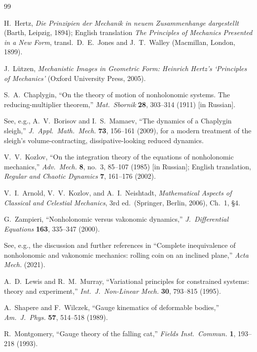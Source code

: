 \begin{thebibliography}{99}

H.~Hertz, \emph{Die Prinzipien der Mechanik in neuem Zusammenhange
  dargestellt} (Barth, Leipzig, 1894); English translation
  \emph{The Principles of Mechanics Presented in a New Form},
  transl.\ D.~E.\ Jones and J.~T.\ Walley (Macmillan, London, 1899).

J.~L\"utzen, \emph{Mechanistic Images in Geometric Form: Heinrich
  Hertz's `Principles of Mechanics'} (Oxford University Press,
  2005).

S.~A.~Chaplygin, ``On the theory of motion of nonholonomic
  systems. The reducing-multiplier theorem,'' \emph{Mat.\ Sbornik}
  \textbf{28}, 303--314 (1911) [in Russian].

See, e.g., A.~V.~Borisov and I.~S.~Mamaev, ``The dynamics of a
  Chaplygin sleigh,'' \emph{J.\ Appl.\ Math.\ Mech.} \textbf{73},
  156--161 (2009), for a modern treatment of the sleigh's
  volume-contracting, dissipative-looking reduced dynamics.

V.~V.~Kozlov, ``On the integration theory of the equations of
  nonholonomic mechanics,'' \emph{Adv.\ Mech.} \textbf{8}, no.~3,
  85--107 (1985) [in Russian]; English translation,
  \emph{Regular and Chaotic Dynamics} \textbf{7}, 161--176 (2002).

V.~I.~Arnold, V.~V.~Kozlov, and A.~I.~Neishtadt,
  \emph{Mathematical Aspects of Classical and Celestial Mechanics},
  3rd ed.\ (Springer, Berlin, 2006), Ch.~1, \S4.

G.~Zampieri, ``Nonholonomic versus vakonomic dynamics,''
  \emph{J.\ Differential Equations} \textbf{163}, 335--347 (2000).

See, e.g., the discussion and further references in
  ``Complete inequivalence of nonholonomic and vakonomic mechanics:
  rolling coin on an inclined plane,'' \emph{Acta Mech.} (2021).

A.~D.~Lewis and R.~M.~Murray, ``Variational principles for
  constrained systems: theory and experiment,''
  \emph{Int.\ J.\ Non-Linear Mech.} \textbf{30}, 793--815 (1995).

A.~Shapere and F.~Wilczek, ``Gauge kinematics of deformable
  bodies,'' \emph{Am.\ J.\ Phys.} \textbf{57}, 514--518 (1989).

R.~Montgomery, ``Gauge theory of the falling cat,''
  \emph{Fields Inst.\ Commun.} \textbf{1}, 193--218 (1993).


\end{thebibliography}
